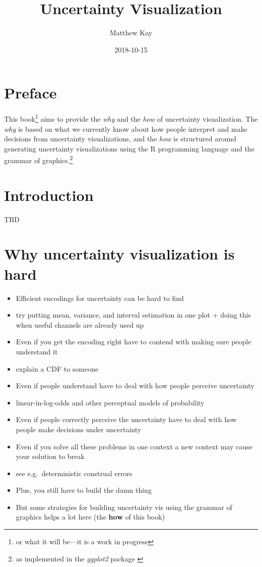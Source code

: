 \documentclass[]{book}
\title{Uncertainty Visualization}
\author{Matthew Kay}
\date{2018-10-15}
\providecommand{\tightlist}{%
  \setlength{\itemsep}{0pt}\setlength{\parskip}{0pt}}
\let\rmarkdownfootnote\footnote%
\def\footnote{\protect\rmarkdownfootnote}
\theoremstyle{definition}
\theoremstyle{definition}
\theoremstyle{definition}
\theoremstyle{remark}
\begin{document}
\maketitle

{
\setcounter{tocdepth}{1}
\tableofcontents
}
\chapter*{Preface}\label{preface}

This book\footnote{or what it will be---it is a work in progress} aims
to provide the \emph{why} and the \emph{how} of uncertainty
visualization. The \emph{why} is based on what we currently know about
how people interpret and make decisions from uncertainty visualizations,
and the \emph{how} is structured around generating uncertainty
visualizations using the R programming language and the grammar of
graphics.\footnote{as implemented in the \emph{ggplot2} package
  \citep{R-ggplot2}}

\chapter{Introduction}\label{ch-intro}

TBD

\chapter{Why uncertainty visualization is hard}\label{ch-why-hard}

\begin{itemize}
\tightlist
\item
  Efficient encodings for uncertainty can be hard to find
\item
  try putting mean, variance, and interval estimation in one plot +
  doing this when useful channels are already used up
\item
  Even if you get the encoding right have to contend with making sure
  people understand it
\item
  explain a CDF to someone
\item
  Even if people understand have to deal with how people perceive
  uncertainty
\item
  linear-in-log-odds and other perceptual models of probability
\item
  Even if people correctly perceive the uncertainty have to deal with
  how people make decisions under uncertainty
\item
  Even if you solve all these problems in one context a new context may
  cause your solution to break
\item
  see e.g.~deterministic construal errors
\item
  Plus, you still have to build the damn thing
\item
  But some strategies for building uncertainty vis using the grammar of
  graphics helps a lot here (the \textbf{how} of this book)
\end{itemize}
\end{document}

